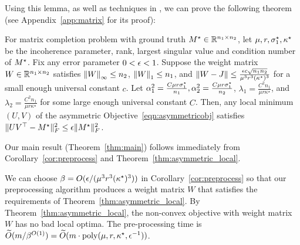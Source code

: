 Using this lemma, as well as techniques in \citep{GeJZ17}, we can prove the following theorem (see Appendix~\ref{app:matrix} for its proof):
%
\begin{theorem} \label{thm:asymmetric_local}
For matrix completion problem with ground truth $M^\star \in \mathbb{R}^{n_1 \times n_2}$, let $\mu, r, \sigma^\star_1, \kappa^\star$ be the incoherence parameter, rank, largest singular value and condition number of $M^\star$.
Fix any error parameter $0 < \epsilon < 1$.
Suppose the weight matrix $W \in \mathbb{R}^{n_1 \times n_2}$ satisfies ${\lVert W{\rVert}}_\infty \le n_2$, ${\lVert W{\rVert}}_1 \le n_1$, and $\|W-J\| \le \frac{\epsilon c\sqrt{n_1n_2}}{\mu^3 r^3 (\kappa^\star)^3}$ for a small enough universal constant $c$.
Let $\alpha_1^2 = \frac{C\mu r\sigma^\star_1}{n_1},\alpha_2^2 = \frac{C\mu r\sigma^\star_1}{n_2}$, $\lambda_1 = \frac{C^2 n_1}{\mu r\kappa^\star}$, and $\lambda_2 = \frac{C^2 n_1}{\mu r\kappa^\star}$ for some large enough universal constant $C$. Then, any local minimum $(U, V)$ of the asymmetric Objective~\eqref{eqn:asymmetricobj} satisfies $\|UV^\top-M^\star\|_F^2 \le \epsilon \|M^\star\|_F^2$. 
\end{theorem}


Our main result (Theorem~\ref{thm:main}) follows immediately from Corollary~\ref{cor:preprocess} and Theorem~\ref{thm:asymmetric_local}.

We can choose $\beta = O(\epsilon / (\mu^3 r^3 (\kappa^\star)^3))$ in Corollary~\ref{cor:preprocess} so that our preprocessing algorithm produces a weight matrix $W$ that satisfies the requirements of Theorem~\ref{thm:asymmetric_local}.
By Theorem~\ref{thm:asymmetric_local}, the non-convex objective with weight matrix $W$ has no bad local optima.
The pre-processing time is $\widetilde O(m / \beta^{O(1)}) = \widetilde O(m \cdot \mathrm{poly}(\mu, r, \kappa^\star, \epsilon^{-1}))$.%